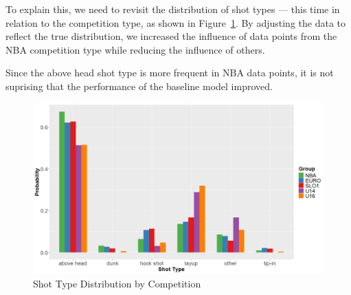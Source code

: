 \documentclass[9pt]{IEEEtran}
\begin{document}
To explain this, we need to revisit the distribution of shot types — this time in 
relation to the competition type, as shown in Figure~\ref{fig:shot_distr_comp}. By 
adjusting the data to reflect the true distribution, we increased the influence of data
 points from the NBA competition type while reducing the influence of others.

Since the above head shot type is more frequent in NBA data points, it is not 
suprising that the performance of the baseline model improved.

 \begin{figure}[h]
    \centering
    \includegraphics[width=0.95\columnwidth]{figures/shot_distr_comp.png}
    \caption{Shot Type Distribution by Competition}
    \label{fig:shot_distr_comp}
\end{figure}
\end{document}
